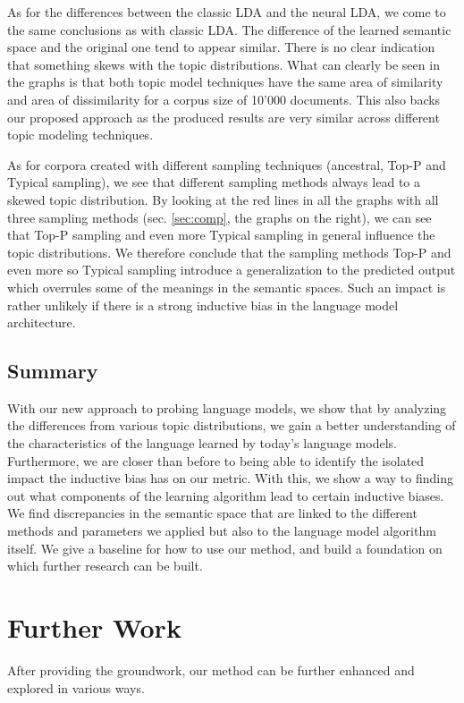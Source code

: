 As for the differences between the classic LDA and the neural LDA, we come to the same conclusions as with classic LDA. The difference of the learned semantic space and the original one tend to appear similar. There is no clear indication that something skews with the topic distributions. What can clearly be seen in the graphs is that both topic model techniques have the same area of similarity and area of dissimilarity for a corpus size of 10'000 documents. This also backs our proposed approach as the produced results are very similar across different topic modeling techniques.

As for corpora created with different sampling techniques (ancestral, Top-P and Typical sampling), we see that different sampling methods always lead to a skewed topic distribution. By looking at the red lines in all the graphs with all three sampling methods (sec. \ref{sec:comp}, the graphs on the right), we can see that Top-P sampling and even more Typical sampling in general influence the topic distributions. We therefore conclude that the sampling methods Top-P and even more so Typical sampling introduce a generalization to the predicted output which overrules some of the meanings in the semantic spaces. Such an impact is rather unlikely if there is a strong inductive bias in the language model architecture.

\subsection{Summary}
With our new approach to probing language models, we show that by analyzing the differences from various topic distributions, we gain a better understanding of the characteristics of the language learned by today's language models. Furthermore, we are closer than before to being able to identify the isolated impact the inductive bias has on our metric. With this, we show a way to finding out what components of the learning algorithm lead to certain inductive biases. We find discrepancies in the semantic space that are linked to the different methods and parameters we applied but also to the language model algorithm itself. We give a baseline for how to use our method, and build a foundation on which further research can be built. 

\section{Further Work}
After providing the groundwork, our method can be further enhanced and explored in various ways. 

